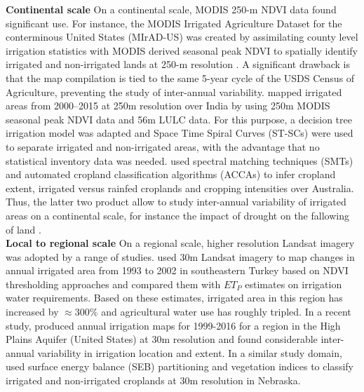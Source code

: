 \documentclass[hess, manuscript]{copernicus}
\begin{document}
\textbf{Continental scale}
On a continental scale, MODIS 250-m NDVI data found significant use. For instance, the MODIS Irrigated Agriculture Dataset for the conterminous United States (MIrAD-US) was created by assimilating county level irrigation statistics with MODIS derived seasonal peak NDVI to spatially identify irrigated and non-irrigated lands at 250-m resolution \citep{Ozdogan_2008, pervez2008evaluation, Pervez_2010}. A significant drawback is that the map compilation is tied to the same 5-year cycle of the USDS Census of Agriculture, preventing the study of inter-annual variability. \citet{Ambika2016} mapped irrigated areas from 2000–2015 at 250m resolution over India by using 250m MODIS seasonal peak NDVI data and 56m LULC data. For this purpose, a decision tree irrigation model \citep{Pervez2014,Pervez_2010} was adapted and Space Time Spiral Curves (ST-SCs) were used to separate irrigated and non-irrigated areas, with the advantage that no statistical inventory data was needed. \citet{Teluguntla2017} used spectral matching techniques (SMTs) and automated cropland classification algorithms (ACCAs) to infer cropland extent, irrigated versus rainfed croplands and cropping intensities over Australia. Thus, the latter two product allow to study inter-annual variability of irrigated areas on a continental scale, for instance the impact of drought on the fallowing of land \citep{Ambika2016}.\\

\textbf{Local to regional scale}
On a regional scale, higher resolution Landsat imagery was adopted by a range of studies. \citet{Ozdogan2006} used 30m Landsat imagery to map changes in annual irrigated area from 1993 to 2002 in southeastern Turkey based on NDVI thresholding approaches and compared them with $ET_{P}$ estimates on irrigation water requirements. Based on these estimates, irrigated area in this region has increased by $\approx 300\%$ and agricultural water use has roughly tripled. In a recent study, \citet{Deines2017} produced annual irrigation maps for 1999-2016 for a region in the High Plains Aquifer (United States) at 30m resolution and found considerable inter-annual variability in irrigation location and extent. In a similar study domain, \citet{Pun2017} used surface energy balance (SEB) partitioning and vegetation indices to classify irrigated and non-irrigated croplands at 30m resolution in Nebraska.
\end{document}
